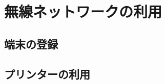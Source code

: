 \documentclass[main]{subfiles}
\begin{document}
\chapter{無線ネットワークの利用}
\section{端末の登録}
\section{プリンターの利用}
\end{document}
